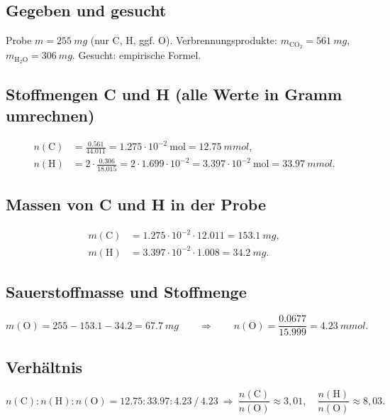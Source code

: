
\subsection*{Gegeben und gesucht}
Probe $m = \qty{255}{mg}$ (nur C, H, ggf. O). Verbrennungsprodukte:
$m_{\mathrm{CO_2}} = \qty{561}{mg}$, $m_{\mathrm{H_2O}} = \qty{306}{mg}$.
Gesucht: empirische Formel.

\subsection*{Stoffmengen C und H (alle Werte in Gramm umrechnen)}
\begin{align*}
  n(\mathrm{C}) &= \frac{0.561}{44.011} = 1.275\cdot10^{-2}\ \mathrm{mol}
    = \qty{12.75}{mmol},\\
  n(\mathrm{H}) &= 2\cdot\frac{0.306}{18.015}
    = 2 \cdot 1.699\cdot10^{-2} = 3.397\cdot10^{-2}\ \mathrm{mol}
    = \qty{33.97}{mmol}.
\end{align*}

\subsection*{Massen von C und H in der Probe}
\begin{align*}
  m(\mathrm{C}) &= 1.275\cdot10^{-2} \cdot 12.011 = \qty{153.1}{mg},\\
  m(\mathrm{H}) &= 3.397\cdot10^{-2} \cdot 1.008 = \qty{34.2}{mg}.
\end{align*}

\subsection*{Sauerstoffmasse und Stoffmenge}
\begin{equation}
  m(\mathrm{O}) = 255 - 153.1 - 34.2 = \qty{67.7}{mg}
  \qquad\Rightarrow\qquad
  n(\mathrm{O}) = \frac{0.0677}{15.999} = \qty{4.23}{mmol}.
\end{equation}

\subsection*{Verhältnis}
\begin{equation}
  n(\mathrm{C}):n(\mathrm{H}):n(\mathrm{O})
  = 12.75:33.97:4.23 \ \Big/\, 4.23 \ \Rightarrow\ 
  \frac{n(\mathrm{C})}{n(\mathrm{O})}\approx 3,01,\quad
  \frac{n(\mathrm{H})}{n(\mathrm{O})}\approx 8,03.
\end{equation}

